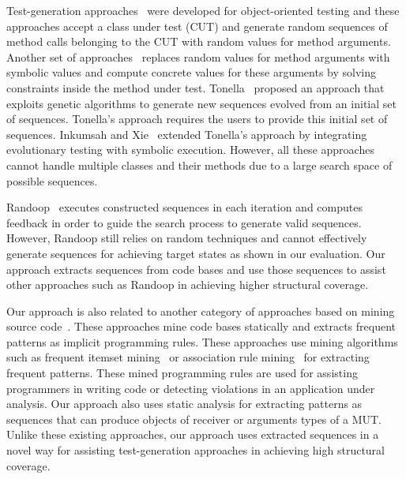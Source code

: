 \documentclass{sig-alternate}
\begin{document}
Test-generation approaches~\cite{csallner:jcrasher, JTEST, pacheco:eclat, xie:rostra} were developed for object-oriented testing and these approaches accept a class under test (CUT) and generate random sequences of method calls belonging to the CUT with random values for method arguments. Another set of approaches~\cite{inkumsah08:improving} replaces random values for method arguments with symbolic values and compute concrete values for these arguments by solving constraints inside the method under test. Tonella~\cite{tonella:etoc} proposed an approach that exploits genetic algorithms to generate new sequences evolved from an initial set of sequences. Tonella's approach requires the users to provide this initial set of sequences. Inkumsah and Xie~\cite{inkumsah08:improving} extended Tonella's approach by integrating evolutionary testing with symbolic execution. However, all these approaches cannot handle multiple classes and their methods due to a large search space of possible sequences. 

Randoop~\cite{pacheco:feedback} executes constructed sequences in each iteration and computes feedback in order to guide the search process to generate valid sequences. However, Randoop still relies on random techniques and cannot effectively generate sequences for achieving target states as shown in our evaluation. Our approach extracts sequences from code bases and use those sequences to assist other approaches such as Randoop in achieving higher structural coverage.

Our approach is also related to another category of approaches based on mining source code~\cite{Engler2001deviant, acharya06:mining, wasylkowski07:detecting, thummalapenta07:parseweb, thummalapenta09:mining}. These approaches mine code bases statically and extracts frequent patterns as implicit programming rules. These approaches use mining algorithms such as frequent itemset mining~\cite{wang:bide} or association rule mining~\cite{agarwal:association} for extracting frequent patterns. These mined programming rules are used for assisting programmers in writing code or detecting violations in an application under analysis. Our approach also uses static analysis for extracting patterns as sequences that can produce objects of receiver or arguments types of a MUT. Unlike these existing approaches, our approach uses extracted sequences in a novel way for assisting test-generation approaches in achieving high structural coverage.
\end{document}
